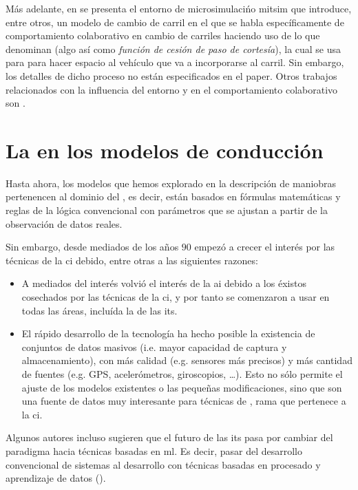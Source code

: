 Más adelante, en \cite{Yang1996} se presenta el entorno de microsimulacińo \gls{mitsim} que introduce, entre otros, un modelo de cambio de carril en el que se habla específicamente de comportamiento colaborativo en cambio de carriles haciendo uso de lo que denominan \textit{} (algo así como \textit{función de cesión de paso de cortesía}), la cual se usa para para hacer espacio al vehículo que va a incorporarse al carril. Sin embargo, los detalles de dicho proceso no están especificados en el paper. Otros trabajos relacionados con la influencia del entorno y en el comportamiento colaborativo son \cite{Ahmed1999, Hidas2002}.

\section{La  en los modelos de conducción}

Hasta ahora, los modelos que hemos explorado en la descripción de maniobras pertenencen al dominio del  , es decir, están basados en fórmulas matemáticas y reglas de la lógica convencional con parámetros que se ajustan a partir de la observación de datos reales.

Sin embargo, desde mediados de los años $90$ empezó a crecer el interés por las técnicas de la \gls{ci} debido, entre otras a las siguientes razones:

\begin{itemize}
	\item A mediados del interés volvió el interés de la \gls{ai} debido a los éxistos cosechados por las técnicas de la \gls{ci}, y por tanto se comenzaron a usar en todas las áreas, incluída la de las its.
	\item El rápido desarrollo de la tecnología ha hecho posible la existencia de conjuntos de datos masivos (i.e. mayor capacidad de captura y almacenamiento), con más calidad (e.g. sensores más precisos) y más cantidad de fuentes (e.g. GPS, acelerómetros, giroscopios, \ldots). Esto no sólo permite el ajuste de los modelos existentes o las pequeñas modificaciones, sino que son una fuente de datos muy interesante para técnicas de , rama que pertenece a la \gls{ci}.
\end{itemize}

Algunos autores incluso sugieren que el futuro de las \gls{its} pasa por cambiar del paradigma hacia técnicas basadas en \gls{ml}. Es decir, pasar del desarrollo convencional de sistemas al desarrollo con técnicas basadas en procesado y aprendizaje de datos (\cite{Zhang2011}).

